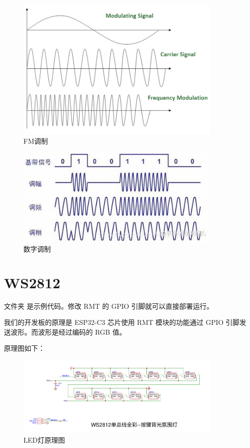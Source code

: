 \documentclass[lang=cn,newtx,10pt,scheme=chinese]{elegantbook}
\begin{document}
\begin{figure}[!htb]
\centering
\includegraphics[width=0.9\textwidth]{Frequency_Modulation.png}
\caption{FM调制}
\label{fig:FM-Modulation}
\end{figure}

\begin{figure}[!htb]
\centering
\includegraphics[width=0.9\textwidth]{RMT-4.png}
\caption{数字调制}
\end{figure}

\section{WS2812}

文件夹  是示例代码。修改 RMT 的 GPIO 引脚就可以直接部署运行。

我们的开发板的原理是 ESP32-C3 芯片使用 RMT 模块的功能通过 GPIO 引脚发送波形。而波形是经过编码的 RGB 值。

原理图如下：

\begin{figure}[!htb]
\centering
\includegraphics[width=0.9\textwidth]{ws2812.png}
\caption{LED灯原理图}
\end{figure}
\end{document}
